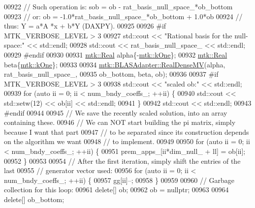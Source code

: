 \begin{DoxyCode}
{{00922     \textcolor{comment}{// Such operation is: sob = ob - rat\_basis\_null\_space\_*ob\_bottom}
00923     \textcolor{comment}{// or:                 ob = -1.0*rat\_basis\_null\_space\_*ob\_bottom + 1.0*ob}
00924     \textcolor{comment}{// thus:                Y =    a*A    *x         +   b*Y (DAXPY).}
00925 
00926 \textcolor{preprocessor}{    #if MTK\_VERBOSE\_LEVEL > 3}
00927     std::cout << \textcolor{stringliteral}{"Rational basis for the null-space:"} << std::endl;
00928     std::cout << rat\_basis\_null\_space\_ << std::endl;
00929 \textcolor{preprocessor}{    #endif}
00930 
00931     \hyperlink{group__c01-roots_gac080bbbf5cbb5502c9f00405f894857d}{mtk::Real} alpha\{-\hyperlink{group__c01-roots_ga26407c24d43b6b95480943340d285c71}{mtk::kOne}\};
00932     \hyperlink{group__c01-roots_gac080bbbf5cbb5502c9f00405f894857d}{mtk::Real} beta\{\hyperlink{group__c01-roots_ga26407c24d43b6b95480943340d285c71}{mtk::kOne}\};
00933 
00934     \hyperlink{classmtk_1_1BLASAdapter_afdcac059a4294287cb55638221220646}{mtk::BLASAdapter::RealDenseMV}(alpha, rat\_basis\_null\_space\_,
00935                                   ob\_bottom, beta, ob);
00936 
00937 \textcolor{preprocessor}{    #if MTK\_VERBOSE\_LEVEL > 3}
00938     std::cout << \textcolor{stringliteral}{"scaled ob:"} << std::endl;
00939     \textcolor{keywordflow}{for} (\textcolor{keyword}{auto} ii = 0; ii < num\_bndy\_coeffs\_; ++ii) \{
00940       std::cout << std::setw(12) << ob[ii] << std::endl;
00941     \}
00942     std::cout << std::endl;
00943 \textcolor{preprocessor}{    #endif}
00944 
00945     \textcolor{comment}{// We save the recently scaled solution, into an array containing these.}
00946     \textcolor{comment}{// We can NOT start building the pi matrix, simply because I want that part}
00947     \textcolor{comment}{// to be separated since its construction depends on the algorithm we want}
00948     \textcolor{comment}{// to implement.}
00949 
00950     \textcolor{keywordflow}{for} (\textcolor{keyword}{auto} ii = 0; ii < num\_bndy\_coeffs\_; ++ii) \{
00951       prem\_apps\_[ii*dim\_null\_ + ll] = ob[ii];
00952     \}
00953 
00954     \textcolor{comment}{// After the first iteration, simply shift the entries of the last}
00955     \textcolor{comment}{// generator vector used:}
00956     \textcolor{keywordflow}{for} (\textcolor{keyword}{auto} ii = 0; ii < num\_bndy\_coeffs\_; ++ii) \{
00957       gg[ii]--;
00958     \}
00959 
00960     \textcolor{comment}{// Garbage collection for this loop:}
00961     \textcolor{keyword}{delete}[] ob;
00962     ob = \textcolor{keyword}{nullptr};
00963 
00964     \textcolor{keyword}{delete}[] ob\_bottom;
}}
\end{DoxyCode}
